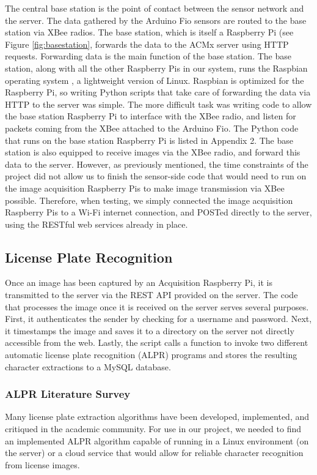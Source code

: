 \documentclass[11pt, oneside, fullpage, doublespace]{article}
\begin{document}
The central base station is the point of contact between the sensor network and the server. The data gathered by the Arduino Fio sensors are routed to the base station via XBee radios. The base station, which is itself a Raspberry Pi (see Figure \ref{fig:basestation}, forwards the data to the ACMx server using HTTP requests. Forwarding data is the main function of the base station. The base station, along with all the other Raspberry Pis in our system, runs the Raspbian operating system \cite{raspbian}, a lightweight version of Linux. Raspbian is optimized for the Raspberry Pi, so writing Python scripts that take care of forwarding the data via HTTP to the server was simple. The more difficult task was writing code to allow the base station Raspberry Pi to interface with the XBee radio, and listen for packets coming from the XBee attached to the Arduino Fio. The Python code that runs on the base station Raspberry Pi is listed in Appendix 2. The base station is also equipped to receive images via the XBee radio, and forward this data to the server. However, as previously mentioned, the time constraints of the project did not allow us to finish the sensor-side code that would need to run on the image acquisition Raspberry Pis to make image transmission via XBee possible. Therefore, when testing, we simply connected the image acquisition Raspberry Pis to a Wi-Fi internet connection, and POSTed directly to the server, using the RESTful web services already in place.

\subsection{License Plate Recognition}
Once an image has been captured by an Acquisition Raspberry Pi, it is transmitted to the server via the REST API provided on the server. The code that processes the image once it is received on the server serves several purposes. First, it authenticates the sender by checking for a username and password. Next, it timestamps the image and saves it to a directory on the server not directly accessible from the web. Lastly, the script calls a function to invoke two different automatic license plate recognition (ALPR) programs and stores the resulting character extractions to a MySQL database.

\subsubsection{ALPR Literature Survey}
Many license plate extraction algorithms have been developed, implemented, and critiqued in the academic community. For use in our project, we needed to find an implemented ALPR algorithm capable of running in a Linux environment (on the server) or a cloud service that would allow for reliable character recognition from license images.
\end{document}

